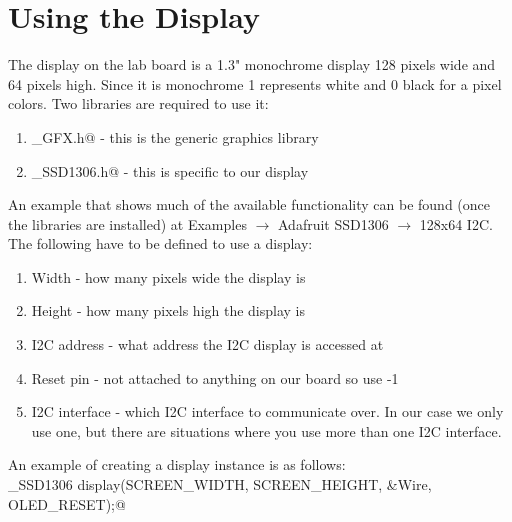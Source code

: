 \section{Using the Display}
The display on the lab board is a 1.3" monochrome display 128 pixels wide and 64 pixels high. Since it is 
monochrome 1 represents white and 0 black for a pixel colors. Two libraries are required to use it:
\begin{enumerate}
	\item \lstinline@Adafruit_GFX.h@ - this is the generic graphics library
	\item \lstinline@Adafruit_SSD1306.h@ - this is specific to our display
\end{enumerate}
An example that shows much of the available functionality can be found (once the libraries are installed)
at Examples $\rightarrow$ Adafruit SSD1306 $\rightarrow$ 128x64 I2C. The following have to be defined to 
use a display:
\begin{enumerate}
	\item Width - how many pixels wide the display is 
	\item Height - how many pixels high the display is 
	\item I2C address - what address the I2C display is accessed at 
	\item Reset pin - not attached to anything on our board so use -1
	\item I2C interface - which I2C interface to communicate over. In our case we only use one, but 
			there are situations where you use more than one I2C interface.
\end{enumerate}
An example of creating a display instance is as follows:\\
\lstinline@Adafruit_SSD1306 display(SCREEN_WIDTH, SCREEN_HEIGHT, &Wire, OLED_RESET);@

